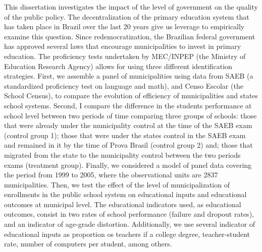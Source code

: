 \documentclass[a4paper, 12pt]{article}
\begin{document}
This dissertation investigates the impact of the level of government on the quality of the public policy. The decentralization of the primary education system that has taken place in Brazil over the last 20 years give us leverage to empirically examine this question.  Since redemocratization, the Brazilian federal government has approved several laws that encourage municipalities to invest in primary education. The proficiency tests undertaken by MEC/INPEP (the Ministry of Education Research Agency) allows for using three different identification strategies. First, we assemble a panel of municipalities using data from SAEB (a standardized proficiency test on language and math), and Censo Escolar (the School Census), to compare the evolution of efficiency of municipalities and states school systems. Second, I compare the difference in the students performance at school level between two periods of time comparing three groups of schools: those that were already under the municipality control at the time of the SAEB exam (control group 1); those that were under the states control in the SAEB exam and remained in it by the time of Prova Brasil (control group 2) and; those that migrated from the state to the municipality control between the two periods exams (treatment group). Finally, we considered a model of panel data covering the period from 1999 to 2005, where the observational units are 2837 municipalities. Then, we test the effect of the level of municipalization of enrollments in the public school system on educational inputs and educational outcomes at municipal level. The educational indicators used, as educational outcomes, consist in two rates of school performance (failure and dropout rates), and an indicator of age-grade distortion. Additionally, we use several indicator of educational inputs as proportion os teachers if a college degree, teacher-student rate, number of computers per student, among others.


\pagebreak
\begin{singlespacing}
\thispagestyle{empty}
\pagebreak
\noindent     
\setlength{\parindent}{0cm} \thispagestyle{empty}

\tableofcontents 

\noindent     
\setlength{\parindent}{0cm} \thispagestyle{empty}
\pagebreak


\thispagestyle{empty}
\pagebreak
\noindent     
\setlength{\parindent}{0cm} \thispagestyle{empty}


\listoffigures

\noindent
\setlength{\parindent}{0cm} \thispagestyle{empty}
\pagebreak





\thispagestyle{empty}
\pagebreak
\noindent     
\setlength{\parindent}{0cm} \thispagestyle{empty}

\listoftables

\noindent
\setlength{\parindent}{0cm} \thispagestyle{empty}
\pagebreak
\end{singlespacing}
\end{document}
